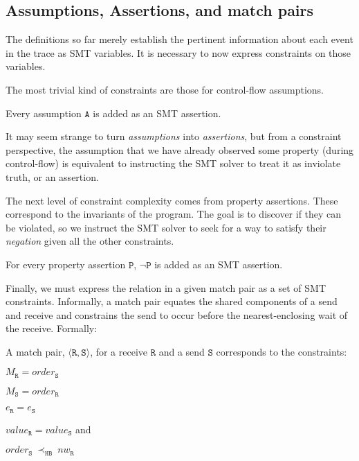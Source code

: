 \subsection{Assumptions, Assertions, and match pairs}

The definitions so far merely establish the pertinent information
about each event in the trace as SMT variables. It is necessary to now express
constraints on those variables.

The most trivial kind of constraints are those for control-flow
assumptions.

\begin{definition}[Assumption] \label{def:assm}
Every assumption $\mathtt{A}$ is added as an SMT assertion.
\end{definition}

It may seem strange to turn \emph{assumptions} into
\emph{assertions}, but from a constraint perspective, the assumption
that we have already observed some property (during control-flow) is
equivalent to instructing the SMT solver to treat it as inviolate
truth, or an assertion.

The next level of constraint complexity comes from property
assertions. These correspond to the invariants of the program. The
goal is to discover if they can be violated, so we instruct the SMT
solver to seek for a way to satisfy their \emph{negation} given all
the other constraints.

\begin{definition} \label{def:assert}
For every property assertion $\mathtt{P}$, $\neg \mathtt{P}$ is added as
an SMT assertion.
\end{definition}

Finally, we must express the relation in a given match pair as a set of SMT
constraints. Informally, a match pair equates the shared components of
a send and receive and constrains the send to occur before the
nearest-enclosing wait of the receive. Formally:

\begin{definition} \label{def:match}
A match pair, $\langle\mathtt{R}, \mathtt{S}\rangle$, for a receive
$\mathtt{R}$ and a send $\mathtt{S}$ corresponds to the constraints:
\begin{compactenum}
\item $M_{\mathtt{R}} = \mathit{order}_{\mathtt{S}}$
\item $M_{\mathtt{S}} = \mathit{order}_{\mathtt{R}}$
\item $e_{\mathtt{R}} = e_{\mathtt{S}}$
\item $\mathit{value}_{\mathtt{R}} = \mathit{value}_{\mathtt{S}}$ and
\item $\mathit{order}_{\mathtt{S}}\ \mathrm{\prec_\mathtt{HB}}\ \mathit{nw}_{\mathtt{R}}$
\end{compactenum}
\end{definition}

